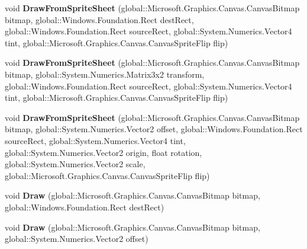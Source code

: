 \begin{DoxyCompactItemize}
void {\bfseries Draw\+From\+Sprite\+Sheet} (global\+::\+Microsoft.\+Graphics.\+Canvas.\+Canvas\+Bitmap bitmap, global\+::\+Windows.\+Foundation.\+Rect dest\+Rect, global\+::\+Windows.\+Foundation.\+Rect source\+Rect, global\+::\+System.\+Numerics.\+Vector4 tint, global\+::\+Microsoft.\+Graphics.\+Canvas.\+Canvas\+Sprite\+Flip flip)
\item 
\mbox{\label{interface_microsoft_1_1_graphics_1_1_canvas_1_1_i_canvas_sprite_batch_a16ce9e3d6fcd3a35b2ca5ddc20b167fa}} 
void {\bfseries Draw\+From\+Sprite\+Sheet} (global\+::\+Microsoft.\+Graphics.\+Canvas.\+Canvas\+Bitmap bitmap, global\+::\+System.\+Numerics.\+Matrix3x2 transform, global\+::\+Windows.\+Foundation.\+Rect source\+Rect, global\+::\+System.\+Numerics.\+Vector4 tint, global\+::\+Microsoft.\+Graphics.\+Canvas.\+Canvas\+Sprite\+Flip flip)
\item 
\mbox{\label{interface_microsoft_1_1_graphics_1_1_canvas_1_1_i_canvas_sprite_batch_ac11b7ca2c7e66d7f79048004f3a75b53}} 
void {\bfseries Draw\+From\+Sprite\+Sheet} (global\+::\+Microsoft.\+Graphics.\+Canvas.\+Canvas\+Bitmap bitmap, global\+::\+System.\+Numerics.\+Vector2 offset, global\+::\+Windows.\+Foundation.\+Rect source\+Rect, global\+::\+System.\+Numerics.\+Vector4 tint, global\+::\+System.\+Numerics.\+Vector2 origin, float rotation, global\+::\+System.\+Numerics.\+Vector2 scale, global\+::\+Microsoft.\+Graphics.\+Canvas.\+Canvas\+Sprite\+Flip flip)
\item 
\mbox{\label{interface_microsoft_1_1_graphics_1_1_canvas_1_1_i_canvas_sprite_batch_a523bb7703d792520261dec0792f80b61}} 
void {\bfseries Draw} (global\+::\+Microsoft.\+Graphics.\+Canvas.\+Canvas\+Bitmap bitmap, global\+::\+Windows.\+Foundation.\+Rect dest\+Rect)
\item 
\mbox{\label{interface_microsoft_1_1_graphics_1_1_canvas_1_1_i_canvas_sprite_batch_a772228b4cde10ff970a8e93625163bd8}} 
void {\bfseries Draw} (global\+::\+Microsoft.\+Graphics.\+Canvas.\+Canvas\+Bitmap bitmap, global\+::\+System.\+Numerics.\+Vector2 offset)
\item 
\mbox{\label{interface_microsoft_1_1_graphics_1_1_canvas_1_1_i_canvas_sprite_batch_ab0083cf0eb076b27d60e179234004436}} 

\end{DoxyCompactItemize}

